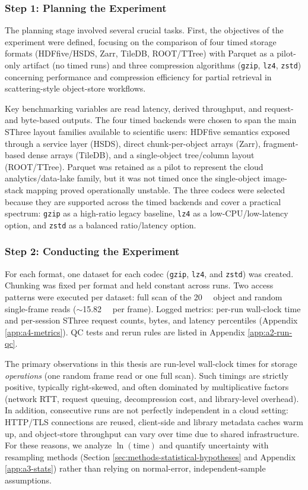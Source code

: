 \documentclass[nomenclature, english, bibtex]{kththesis}
\numberwithin{listing}{chapter}
\begin{document}
\subsubsection{Step 1: Planning the Experiment}
The planning stage involved several crucial tasks. First, the objectives of the experiment were defined, focusing on the comparison of four timed storage formats (\gls{HDFfive}/\gls{HSDS}, Zarr, TileDB, \gls{ROOT}/\gls{TTree}) with Parquet as a pilot-only artifact (no timed runs) and three compression algorithms (\texttt{gzip}, \texttt{lz4}, \texttt{zstd}) concerning performance and compression efficiency for partial retrieval in scattering-style object-store workflows.

Key benchmarking variables are read latency, derived throughput, and request- and byte-based outputs. The four timed backends were chosen to span the main \gls{SThree} layout families available to scientific users: \gls{HDFfive} semantics exposed through a service layer (\gls{HSDS}), direct chunk-per-object arrays (Zarr), fragment-based dense arrays (TileDB), and a single-object tree/column layout (\gls{ROOT}/\gls{TTree}). Parquet was retained as a pilot to represent the cloud analytics/data-lake family, but it was not timed once the single-object image-stack mapping proved operationally unstable. The three codecs were selected because they are supported across the timed backends and cover a practical spectrum: \texttt{gzip} as a high-ratio legacy baseline, \texttt{lz4} as a low-\gls{CPU}/low-latency option, and \texttt{zstd} as a balanced ratio/latency option.

\subsubsection{Step 2: Conducting the Experiment}
For each format, one dataset for each codec (\texttt{gzip}, \texttt{lz4}, and \texttt{zstd}) was created. Chunking was fixed per format and held constant across runs. Two access patterns were executed per dataset: full scan of the \SI{20}{\gibi\byte} object and random single-frame reads (\(\sim\)\SI{15.82}{\mebi\byte} per frame). Logged metrics: per-run wall-clock time and per-session \gls{SThree} request counts, bytes, and latency percentiles (Appendix \ref{app:a4-metrics}). QC tests and rerun rules are listed in Appendix \ref{app:a2-run-qc}.

The primary observations in this thesis are run-level wall-clock times for storage \emph{operations} (one random frame read or one full scan). Such timings are strictly positive, typically right-skewed, and often dominated by multiplicative factors (network RTT, request queuing, decompression cost, and library-level overhead). In addition, consecutive runs are not perfectly independent in a cloud setting: \gls{HTTP}/TLS connections are reused, client-side and library metadata caches warm up, and object-store throughput can vary over time due to shared infrastructure. For these reasons, we analyze $\ln(\text{time})$ and quantify uncertainty with resampling methods (Section \ref{sec:methods-statistical-hypotheses} and Appendix \ref{app:a3-stats}) rather than relying on normal-error, independent-sample assumptions.
\end{document}
